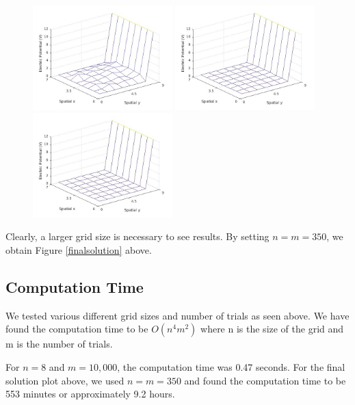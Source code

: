\documentclass{amsart}
\begin{document}
\begin{figure}[H]
	\includegraphics[width=0.48\textwidth]{solution_n=8_m=100.jpg}
	\includegraphics[width=0.48\textwidth]{solution_n=8_m=1000.jpg}
	\includegraphics[width=0.48\textwidth]{solution_n=8_m=10000.jpg}
\end{figure}

Clearly, a larger grid size is necessary to see results. By setting $n=m=350$, we obtain Figure \ref{finalsolution} above.

\subsection{Computation Time}

We tested various different grid sizes and number of trials as seen above. We have found the computation time to be $O(n^4m^2)$ where n is the size of the grid and m is the number of trials.

For $n = 8$ and $m = 10,000$, the computation time was 0.47 seconds. For the final solution plot above, we used $n = m = 350$ and found the computation time to be 553 minutes or approximately 9.2 hours.
\end{document}

